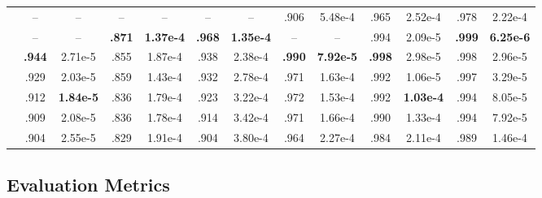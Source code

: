 \documentclass{article}
\makeatletter
\DeclareRobustCommand*{\escapeus}[1]{%
  \begingroup
    \edef\x{\endgroup
      \noexpand\@escapeusaux{\unexpanded{#1}}}%
  \x}
\def\@escapeusaux#1{%
  \begingroup
    \@activeus
    \scantokens{#1\endinput}%
  \endgroup}
\def\@activeus{\catcode`\_=\active \let~\_}}
\newcommand{\myemph}[1]{\textsf{{\escapeus{#1}}}}
\newcommand{\fasttext}{\myemph{fastText}\xspace}
\newcommand{\glotlid}{\myemph{GlotLID-M}\xspace}
\newcommand{\unilid}{\myemph{UniLID}\xspace}
\newcommand{\cld}{\myemph{CLD3}\xspace}
\makeatother
\begin{document}
\begin{table}[ht]
{\begin{tabular}{l cc cc cc | cc cc cc}
\cld 
& -- & -- 
& -- & -- 
& -- & -- 
& .906 & 5.48e-4
& .965 & 2.52e-4
& .978 & 2.22e-4 \\

\glotlid
& -- & --
& \textbf{.871} & \textbf{1.37e-4}
& \textbf{.968} & \textbf{1.35e-4}
& -- & --
& .994 & 2.09e-5
& \textbf{.999} & \textbf{6.25e-6} \\

\fasttext
& \textbf{.944} & 2.71e-5
& .855 & 1.87e-4
& .938 & 2.38e-4
& \textbf{.990} & \textbf{7.92e-5}
& \textbf{.998} & 2.98e-5
& .998 & 2.96e-5 \\

\midrule
\unilid
& .929 & 2.03e-5
& .859 & 1.43e-4
& .932 & 2.78e-4
& .971 & 1.63e-4
& .992 & 1.06e-5
& .997 & 3.29e-5 \\

\unilid-Mistral-Nemo
& .912 & \textbf{1.84e-5}
& .836 & 1.79e-4
& .923 & 3.22e-4
& .972 & 1.53e-4
& .992 & \textbf{1.03e-4}
& .994 & 8.05e-5 \\

\unilid-DeepSeek3.2
& .909 & 2.08e-5
& .836 & 1.78e-4
& .914 & 3.42e-4
& .971 & 1.66e-4
& .990 & 1.33e-4
& .994 & 7.92e-5 \\

\unilid-Qwen3
& .904 & 2.55e-5
& .829 & 1.91e-4
& .904 & 3.80e-4
& .964 & 2.27e-4
& .984 & 2.11e-4
& .989 & 1.46e-4 \\





\bottomrule
\end{tabular}}
\end{table}


\subsection{Evaluation Metrics}
\end{document}
